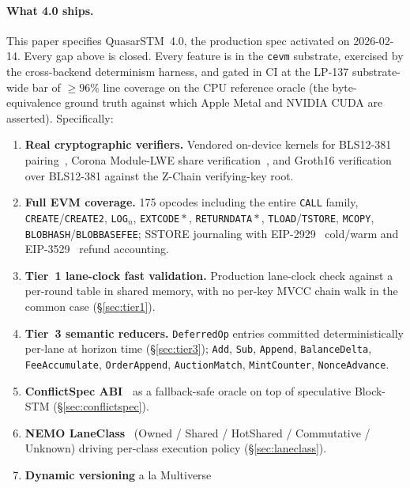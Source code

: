 \paragraph{What 4.0 ships.}
This paper specifies QuasarSTM~4.0, the production spec activated on
2026-02-14. Every gap above is closed. Every feature is in the
\texttt{cevm} substrate, exercised by the cross-backend determinism
harness, and gated in CI at the LP-137 substrate-wide bar of
$\geq 96\%$ line coverage on the CPU reference oracle (the
byte-equivalence ground truth against which Apple Metal and NVIDIA
CUDA are asserted). Specifically:

\begin{enumerate}[leftmargin=2em]
\item \textbf{Real cryptographic verifiers.} Vendored on-device kernels
      for BLS12-381 pairing~\cite{bls12381}, Corona Module-LWE share
      verification~\cite{corona}, and Groth16
      verification~\cite{groth2016} over BLS12-381 against the Z-Chain
      verifying-key root.
\item \textbf{Full EVM coverage.} 175 opcodes including the entire
      \texttt{CALL} family, \texttt{CREATE}/\texttt{CREATE2},
      \texttt{LOG}$_n$, \texttt{EXTCODE}$\!*$, \texttt{RETURNDATA}$\!*$,
      \texttt{TLOAD}/\texttt{TSTORE}, \texttt{MCOPY},
      \texttt{BLOBHASH}/\texttt{BLOBBASEFEE}; SSTORE journaling with
      EIP-2929~\cite{eip2929} cold/warm and EIP-3529~\cite{eip3529}
      refund accounting.
\item \textbf{Tier~1 lane-clock fast validation.} Production lane-clock
      check against a per-round table in shared memory, with no per-key
      MVCC chain walk in the common case (\S\ref{sec:tier1}).
\item \textbf{Tier~3 semantic reducers.} \texttt{DeferredOp} entries
      committed deterministically per-lane at horizon time
      (\S\ref{sec:tier3}); \texttt{Add}, \texttt{Sub}, \texttt{Append},
      \texttt{BalanceDelta}, \texttt{FeeAccumulate}, \texttt{OrderAppend},
      \texttt{AuctionMatch}, \texttt{MintCounter}, \texttt{NonceAdvance}.
\item \textbf{ConflictSpec ABI~\cite{aft2025conflictspec}} as a
      fallback-safe oracle on top of speculative Block-STM
      (\S\ref{sec:conflictspec}).
\item \textbf{NEMO LaneClass}~\cite{nemo2025} (Owned / Shared / HotShared
      / Commutative / Unknown) driving per-class execution policy
      (\S\ref{sec:laneclass}).
\item \textbf{Dynamic versioning} a la Multiverse~\cite{multiverse2026}

\end{enumerate}

